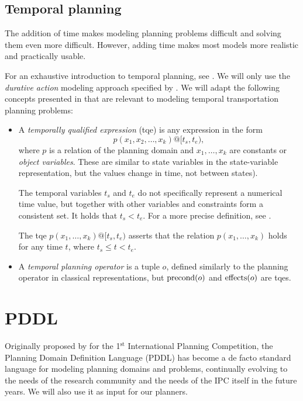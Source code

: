 \subsection{Temporal planning}

The addition of time makes modeling planning problems difficult and
solving them even more difficult.
However, adding time makes most models more realistic and practically usable.

For an exhaustive introduction to temporal planning, see \citet[Chapter~13~and~14]{Ghallab2004}. We will only use the \textit{durative action} modeling approach
specified by \citet[Section~5]{Fox2003}. We will adapt the following concepts presented
in \citet[Section~14.2]{Ghallab2004} that are relevant to modeling temporal transportation planning problems:
\begin{itemize}
\item A \textit{temporally qualified expression} (tqe) is any
expression in the form $$p(x_1, x_2, \ldots, x_k)@[t_s, t_e),$$ where $p$
is a relation of the planning domain and $x_1, \ldots, x_k$ are constants or \textit{object
variables}. These are similar to state variables in the state-variable representation,
but the values change in time, not between states).

The temporal variables $t_s$ and $t_e$ do not specifically represent a numerical time value, but together with other variables and constraints form a consistent set.
It holds that $t_s < t_e$. For a more precise definition, see \citet[Section~14.2.1]{Ghallab2004}.


The tqe $p(x_1, \ldots, x_k)@[t_s, t_e)$
asserts that the relation $p(x_1, \ldots, x_k)$ holds for any time $t$, where
$t_s \leq t < t_e$.

\item A \textit{temporal planning operator} is a tuple $o$, defined similarly to the planning operator in classical representations, but $\operatorname{\textrm{precond}}(o)$ and $\operatorname{\textrm{effects}}(o)$ are tqes.
\end{itemize}













\section{PDDL}\label{pddl}

Originally proposed by \citet{McDermott1998} for the 1$^{\mathrm{st}}$ International Planning
Competition,
the Planning Domain Definition Language (PDDL) has become
a de facto standard language for modeling planning domains and problems,
continually evolving to the needs of the  
research community and the needs of the IPC itself in the future years.
We will also use it as input for our planners.

